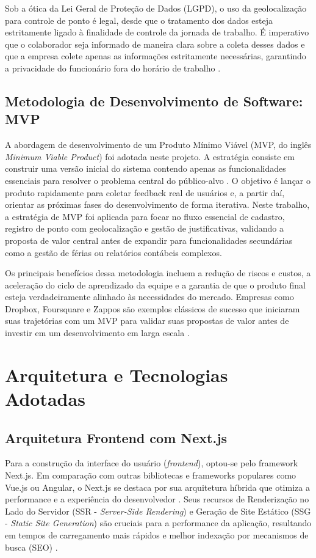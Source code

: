 \par Sob a ótica da Lei Geral de Proteção de Dados (LGPD), o uso da geolocalização para controle de ponto é legal, desde que o tratamento dos dados esteja estritamente ligado à finalidade de controle da jornada de trabalho. É imperativo que o colaborador seja informado de maneira clara sobre a coleta desses dados e que a empresa colete apenas as informações estritamente necessárias, garantindo a privacidade do funcionário fora do horário de trabalho \cite{LGPDeGeolocalizacao}.

\subsection{Metodologia de Desenvolvimento de Software: MVP}
\par A abordagem de desenvolvimento de um Produto Mínimo Viável (MVP, do inglês \textit{Minimum Viable Product}) foi adotada neste projeto. A estratégia consiste em construir uma versão inicial do sistema contendo apenas as funcionalidades essenciais para resolver o problema central do público-alvo \cite{MVP_RDStation}. O objetivo é lançar o produto rapidamente para coletar feedback real de usuários e, a partir daí, orientar as próximas fases do desenvolvimento de forma iterativa. Neste trabalho, a estratégia de MVP foi aplicada para focar no fluxo essencial de cadastro, registro de ponto com geolocalização e gestão de justificativas, validando a proposta de valor central antes de expandir para funcionalidades secundárias como a gestão de férias ou relatórios contábeis complexos.

\par Os principais benefícios dessa metodologia incluem a redução de riscos e custos, a aceleração do ciclo de aprendizado da equipe e a garantia de que o produto final esteja verdadeiramente alinhado às necessidades do mercado. Empresas como Dropbox, Foursquare e Zappos são exemplos clássicos de sucesso que iniciaram suas trajetórias com um MVP para validar suas propostas de valor antes de investir em um desenvolvimento em larga escala \cite{ExemplosMVP}.

\section{Arquitetura e Tecnologias Adotadas}

\subsection{Arquitetura Frontend com Next.js}
\par Para a construção da interface do usuário (\textit{frontend}), optou-se pelo framework Next.js. Em comparação com outras bibliotecas e frameworks populares como Vue.js ou Angular, o Next.js se destaca por sua arquitetura híbrida que otimiza a performance e a experiência do desenvolvedor \cite{NextJsvsAngularVue_Brilworks}. Seus recursos de Renderização no Lado do Servidor (SSR - \textit{Server-Side Rendering}) e Geração de Site Estático (SSG - \textit{Static Site Generation}) são cruciais para a performance da aplicação, resultando em tempos de carregamento mais rápidos e melhor indexação por mecanismos de busca (SEO) \cite{SSReSSG}.

